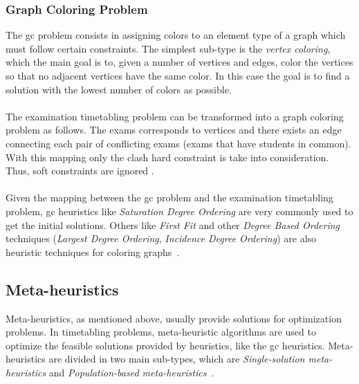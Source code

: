 \subsubsection{Graph Coloring Problem}
The \gls{gc} problem consists in assigning colors to an element type of a graph which must follow certain constraints. The simplest sub-type is the \textit{vertex coloring}, which the main goal is to, given a number of vertices and edges, color the vertices so that no adjacent vertices have the same color. In this case the goal is to find a solution with the lowest number of colors as possible.\\
\\
The examination timetabling problem can be transformed into a graph coloring problem as follows. The exams corresponds to vertices and there exists an edge connecting each pair of conflicting exams (exams that have students in common). With this mapping only the clash hard constraint is take into consideration. Thus, soft constraints are ignored \cite{Qu2009}.\\
\\
Given the mapping between the \gls{gc} problem and the examination timetabling problem, \gls{gc} heuristics like \textit{Saturation Degree Ordering} are very commonly used to get the initial solutions. Others like \textit{First Fit} and other \textit{Degree Based Ordering} techniques (\textit{Largest Degree Ordering}, \textit{Incidence Degree Ordering}) are also heuristic techniques for coloring graphs~\cite{Carter1996}.


\subsection{Meta-heuristics}
\label{metaheuristics}
Meta-heuristics, as mentioned above, usually provide solutions for optimization problems. In timetabling problems, meta-heuristic algorithms are used to optimize the feasible solutions provided by heuristics, like the \gls{gc} heuristics. Meta-heuristics are divided in two main sub-types, which are \textit{Single-solution meta-heuristics} and \textit{Population-based meta-heuristics}~\cite{Talbi2009}.

